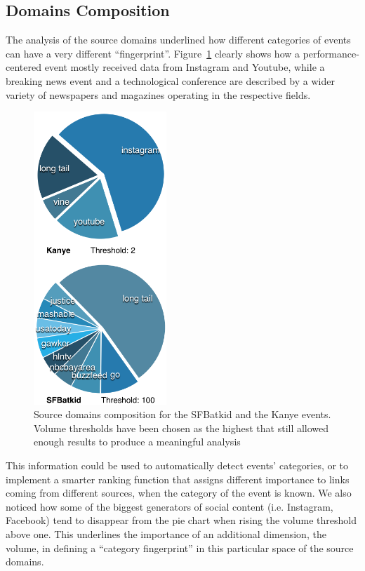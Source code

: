 \documentclass{sig-alternate-somus}
\begin{document}
\subsection{Domains Composition}
\label{sec:domains_composition}
The analysis of the source domains underlined how different categories of events can have a very different ``fingerprint''. Figure~\ref{fig:category_domains} clearly shows how a performance-centered event mostly received data from Instagram and Youtube, while a breaking news event and a technological conference are described by a wider variety of newspapers and magazines operating in the respective fields.
\begin{figure}[htbp]
  \centering
  \includegraphics[width=5cm]{Figures/category_domains.png}
  \caption{Source domains composition for the SFBatkid and the Kanye events. Volume thresholds have been chosen as the highest that still allowed enough results to produce a meaningful analysis}
  \label{fig:category_domains}
\end{figure}
This information could be used to automatically detect events' categories, or to implement a smarter ranking function that assigns different importance to links coming from different sources, when the category of the event is known. We also noticed how some of the biggest generators of social content (i.e. Instagram, Facebook) tend to disappear from the pie chart when rising the volume threshold above one. This underlines the importance of an additional dimension, the volume, in defining a ``category fingerprint'' in this particular space of the source domains.
\end{document}
